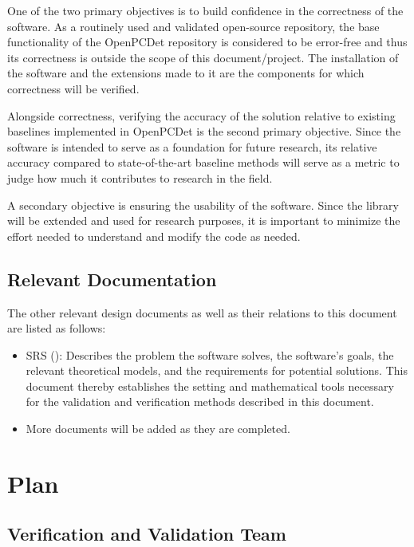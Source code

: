 \documentclass[12pt, titlepage]{article}
\begin{document}
One of the two primary objectives is to build confidence in the correctness of the software.
As a routinely used and validated open-source repository, the base functionality of the OpenPCDet
repository is considered to be error-free and thus its correctness is outside the scope of this document/project.
The installation of the software and the extensions made to it are the components for which correctness will be 
verified. 

Alongside correctness, verifying the accuracy of the solution relative to existing baselines implemented in 
OpenPCDet is the second primary objective. Since the software is intended to serve as a foundation
for future research, its relative accuracy compared to state-of-the-art baseline methods will serve 
as a metric to judge how much it contributes to research in the field.

A secondary objective is ensuring the usability of the software. Since the library will be extended and
used for research purposes, it is important to minimize the effort needed to understand and modify the code
as needed. 

\subsection{Relevant Documentation}

The other relevant design documents as well as their relations to this document are listed as follows:

\begin{itemize}
  \item SRS (\citet{SRS}): Describes the problem the software solves, the software's goals, 
  the relevant theoretical models, and the requirements for potential solutions. This document 
  thereby establishes the setting and mathematical tools necessary for the validation and verification
  methods described in this document.
  \item More documents will be added as they are completed.
\end{itemize}

\section{Plan}


\subsection{Verification and Validation Team}
\end{document}

